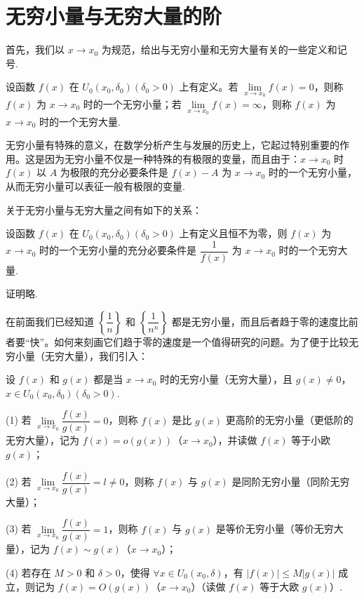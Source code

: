 \section{无穷小量与无穷大量的阶}
\label{sec:ma-3-4}

首先，我们以 $x\to x_0$ 为规范，给出与无穷小量和无穷大量有关的一些定义和记号.

\begin{definition}\label{definition:ma-3-4-1}
设函数 $f(x)$ 在 $U_0(x_0,\delta_0)(\delta_0>0)$ 上有定义。若 $\lim\limits_{x\to x_0}f(x)=0$，则称 $f(x)$ 为 $x\to x_0$ 时的一个无穷小量；若 $\lim\limits_{x\to x_0}f(x)=\infty$，则称 $f(x)$ 为 $x\to x_0$ 时的一个无穷大量.
\end{definition}

无穷小量有特殊的意义，在数学分析产生与发展的历史上，它起过特别重要的作用。这是因为无穷小量不仅是一种特殊的有极限的变量，而且由于：$x\to x_0$ 时 $f(x)$ 以 $A$ 为极限的充分必要条件是 $f(x)-A$ 为 $x\to x_0$ 时的一个无穷小量，从而无穷小量可以表征一般有极限的变量.

关于无穷小量与无穷大量之间有如下的关系：

\begin{theorem}\label{theorem:ma-3-4-1}
设函数 $f(x)$ 在 $U_0(x_0,\delta_0)(\delta_0>0)$ 上有定义且恒不为零，则 $f(x)$ 为 $x\to x_0$ 时的一个无穷小量的充分必要条件是 $\dfrac1{f(x)}$ 为 $x\to x_0$ 时的一个无穷大量.
\end{theorem}


证明略.

在前面我们已经知道 $\left\{\dfrac1n\right\}$ 和 $\left\{\dfrac1{n^n}\right\}$ 都是无穷小量，而且后者趋于零的速度比前者要“快”。如何来刻画它们趋于零的速度是一个值得研究的问题。为了便于比较无穷小量（无穷大量），我们引入：

\begin{definition}\label{definition:ma-3-4-2}
设 $f(x)$ 和 $g(x)$ 都是当 $x\to x_0$ 时的无穷小量（无穷大量），且 $g(x)\ne0$，$x\in U_0(x_0,\delta_0)(\delta_0>0)$.

(1) 若 $\lim\limits_{x\to x_0}\dfrac{f(x)}{g(x)}=0$，则称 $f(x)$ 是比 $g(x)$ 更高阶的无穷小量（更低阶的无穷大量），记为 $f(x)=o(g(x))$（$x\to x_0$），并读做 $f(x)$ 等于小欧 $g(x)$；

(2) 若 $\lim\limits_{x\to x_0}\dfrac{f(x)}{g(x)}=l\ne0$，则称 $f(x)$ 与 $g(x)$ 是同阶无穷小量（同阶无穷大量）；

(3) 若 $\lim\limits_{x\to x_0}\dfrac{f(x)}{g(x)}=1$，则称 $f(x)$ 与 $g(x)$ 是等价无穷小量（等价无穷大量），记为 $f(x)\sim g(x)$（$x\to x_0$）；

(4) 若存在 $M>0$ 和 $\delta>0$，使得 $\forall x\in U_0(x_0,\delta)$，有 $|f(x)|\leqslant M|g(x)|$ 成立，则记为 $f(x)=O(g(x))$（$x\to x_0$）（读做 $f(x)$ 等于大欧 $g(x)$）.
\end{definition}

